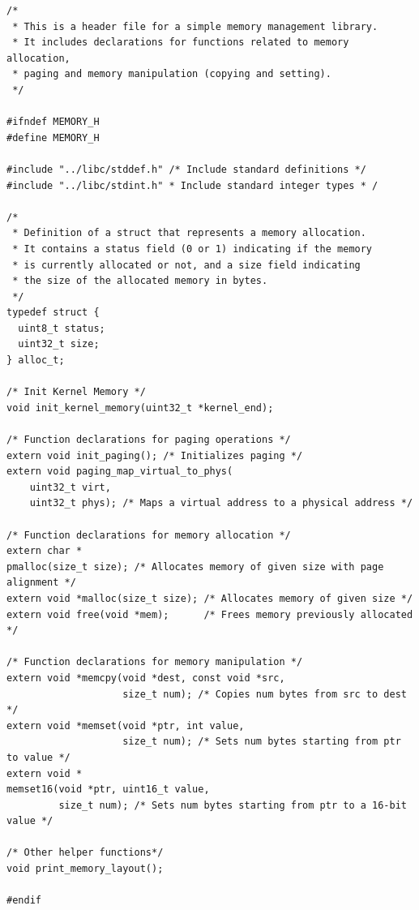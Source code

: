 \documentclass[../main.tex]{subfiles}
\begin{document}
\label{lst:memory_h}
\begin{verbatim}
/*
 * This is a header file for a simple memory management library.
 * It includes declarations for functions related to memory allocation,
 * paging and memory manipulation (copying and setting).
 */

#ifndef MEMORY_H
#define MEMORY_H

#include "../libc/stddef.h" /* Include standard definitions */
#include "../libc/stdint.h" * Include standard integer types * /

/*
 * Definition of a struct that represents a memory allocation.
 * It contains a status field (0 or 1) indicating if the memory
 * is currently allocated or not, and a size field indicating
 * the size of the allocated memory in bytes.
 */
typedef struct {
  uint8_t status;
  uint32_t size;
} alloc_t;

/* Init Kernel Memory */
void init_kernel_memory(uint32_t *kernel_end);

/* Function declarations for paging operations */
extern void init_paging(); /* Initializes paging */
extern void paging_map_virtual_to_phys(
    uint32_t virt,
    uint32_t phys); /* Maps a virtual address to a physical address */

/* Function declarations for memory allocation */
extern char *
pmalloc(size_t size); /* Allocates memory of given size with page alignment */
extern void *malloc(size_t size); /* Allocates memory of given size */
extern void free(void *mem);      /* Frees memory previously allocated */

/* Function declarations for memory manipulation */
extern void *memcpy(void *dest, const void *src,
                    size_t num); /* Copies num bytes from src to dest */
extern void *memset(void *ptr, int value,
                    size_t num); /* Sets num bytes starting from ptr to value */
extern void *
memset16(void *ptr, uint16_t value,
         size_t num); /* Sets num bytes starting from ptr to a 16-bit value */

/* Other helper functions*/
void print_memory_layout();

#endif

\end{verbatim}
\end{document}
